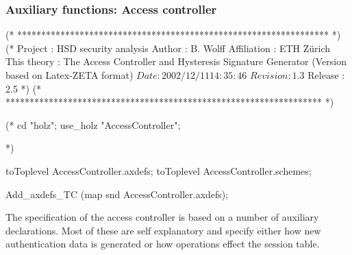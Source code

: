 \documentclass[a4paper,pdftex]{article}
\newenvironment{holz-ml}{\comment}{\endcomment}
\newenvironment{holz-proof}{\comment}{\endcomment}
\begin{document}


\subsubsection{Auxiliary functions: Access controller} \label{acc-spec-sec}

\zsection[SessionManager]{AccessController}

\begin{holz-ml}

(* ***************************************************************** *)
(*      Project         : HSD security analysis
        Author          : B. Wolff
        Affiliation     : ETH Z\"urich
        This theory     : The Access Controller and 
                          Hysteresis Signature Generator 
                          (Version based on Latex-ZETA format)
        $Date: 2002/12/11 14:35:46 $
        $Revision: 1.3 $
        Release         : 2.5                                         *)
(* ****************************************************************** *)

(* cd "holz"; 
   use_holz "AccessController";

 *)

toToplevel AccessController.axdefs;
toToplevel AccessController.schemes;

Add_axdefs_TC (map snd AccessController.axdefs);

\end{holz-ml}

The specification of the access controller
is based on a number of
auxiliary declarations.  Most of these are self explanatory
and specify either how new authentication data is generated
or how operations effect the session table.
\end{document}
